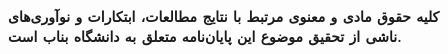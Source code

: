 \thispagestyle{empty}
\begin{singlespace}
\vspace*{\fill}
\begin{center}
{\large\bfseries کلیه حقوق مادی و معنوی مرتبط با نتایج مطالعات، ابتکارات و نوآوری‌های\\[2mm]
ناشی از تحقیق موضوع این پایان‌نامه متعلق به دانشگاه بناب است.}
\end{center}
\vspace*{\fill}
\end{singlespace}
\clearpage
